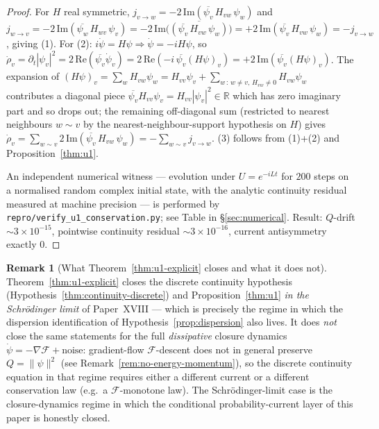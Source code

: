 \documentclass[11pt]{article}
\theoremstyle{definition}
\newtheorem{remark}[theorem]{Remark}
\newcommand{\R}{\mathbb{R}}
\newcommand{\Fcal}{\mathcal{F}}
\begin{document}
\begin{proof}
For $H$ real symmetric, $j_{v \to w} = -2\,\mathrm{Im}(\overline{\psi_v}\,H_{vw}\,\psi_w)$ and $j_{w \to v} = -2\,\mathrm{Im}(\overline{\psi_w}\,H_{wv}\,\psi_v) = -2\,\mathrm{Im}\bigl(\overline{(\overline{\psi_v}\,H_{vw}\,\psi_w)}\bigr) = +2\,\mathrm{Im}(\overline{\psi_v}\,H_{vw}\,\psi_w) = -j_{v \to w}$, giving (1). For (2): $i\dot\psi = H\psi \Rightarrow \dot\psi = -iH\psi$, so $\dot\rho_v = \partial_t|\psi_v|^2 = 2\,\mathrm{Re}(\overline{\psi_v}\dot\psi_v) = 2\,\mathrm{Re}(-i\,\overline{\psi_v}(H\psi)_v) = +2\,\mathrm{Im}(\overline{\psi_v}(H\psi)_v)$. The expansion of $(H\psi)_v = \sum_w H_{vw}\psi_w = H_{vv}\psi_v + \sum_{w\,:\,w\neq v,\, H_{vw}\neq 0} H_{vw}\psi_w$ contributes a diagonal piece $\overline{\psi_v} H_{vv} \psi_v = H_{vv}|\psi_v|^2 \in \R$ which has zero imaginary part and so drops out; the remaining off-diagonal sum (restricted to nearest neighbours $w \sim v$ by the nearest-neighbour-support hypothesis on $H$) gives $\dot\rho_v = \sum_{w \sim v} 2\,\mathrm{Im}(\overline{\psi_v}\,H_{vw}\,\psi_w) = -\sum_{w \sim v} j_{v \to w}$. (3) follows from (1)+(2) and Proposition~\ref{thm:u1}.

An independent numerical witness --- evolution under $U = e^{-iLt}$ for $200$ steps on a normalised random complex initial state, with the analytic continuity residual measured at machine precision --- is performed by \texttt{repro/verify\_u1\_conservation.py}; see Table in \S\ref{sec:numerical}. Result: $Q$-drift $\sim 3 \times 10^{-15}$, pointwise continuity residual $\sim 3 \times 10^{-16}$, current antisymmetry exactly $0$.
\end{proof}

\begin{remark}[What Theorem~\ref{thm:u1-explicit} closes and what it does not]\label{rem:u1-status}
Theorem~\ref{thm:u1-explicit} closes the discrete continuity hypothesis (Hypothesis~\ref{thm:continuity-discrete}) and Proposition~\ref{thm:u1} \emph{in the Schr\"{o}dinger limit} of Paper~XVIII --- which is precisely the regime in which the dispersion identification of Hypothesis~\ref{prop:dispersion} also lives. It does \emph{not} close the same statements for the full \emph{dissipative} closure dynamics $\dot\psi = -\nabla\Fcal + \text{noise}$: gradient-flow $\Fcal$-descent does not in general preserve $Q = \|\psi\|^2$ (see Remark~\ref{rem:no-energy-momentum}), so the discrete continuity equation in that regime requires either a different current or a different conservation law (e.g.\ a $\Fcal$-monotone law). The Schr\"{o}dinger-limit case is the closure-dynamics regime in which the conditional probability-current layer of this paper is honestly closed.
\end{remark}
\end{document}
